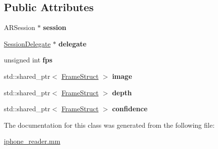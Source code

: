 \subsection*{Public Attributes}
\begin{DoxyCompactItemize}
\item 
\mbox{\label{classmoetsi_1_1ssp_1_1iPhoneReaderImpl_ae6bea0e1182a224b9e8c4f07966708cd}} 
A\+R\+Session $\ast$ {\bfseries session}
\item 
\mbox{\label{classmoetsi_1_1ssp_1_1iPhoneReaderImpl_a8e953a5c87bfc9e2e667d69b5571ccea}} 
\hyperlink{interfaceSessionDelegate}{Session\+Delegate} $\ast$ {\bfseries delegate}
\item 
\mbox{\label{classmoetsi_1_1ssp_1_1iPhoneReaderImpl_aa8675c8a82a1992e81c200aee3e91620}} 
unsigned int {\bfseries fps}
\item 
\mbox{\label{classmoetsi_1_1ssp_1_1iPhoneReaderImpl_a3aa461a5a959ca4d491d2943e2408a34}} 
std\+::shared\+\_\+ptr$<$ \hyperlink{structmoetsi_1_1ssp_1_1FrameStruct}{Frame\+Struct} $>$ {\bfseries image}
\item 
\mbox{\label{classmoetsi_1_1ssp_1_1iPhoneReaderImpl_a2f59ad44c02daa9c2e8361748f3d869d}} 
std\+::shared\+\_\+ptr$<$ \hyperlink{structmoetsi_1_1ssp_1_1FrameStruct}{Frame\+Struct} $>$ {\bfseries depth}
\item 
\mbox{\label{classmoetsi_1_1ssp_1_1iPhoneReaderImpl_abdbbbace561e56401b5f7cb950e77f99}} 
std\+::shared\+\_\+ptr$<$ \hyperlink{structmoetsi_1_1ssp_1_1FrameStruct}{Frame\+Struct} $>$ {\bfseries confidence}
\end{DoxyCompactItemize}


The documentation for this class was generated from the following file\+:\begin{DoxyCompactItemize}
\item 
\hyperlink{iphone__reader_8mm}{iphone\+\_\+reader.\+mm}\end{DoxyCompactItemize}
